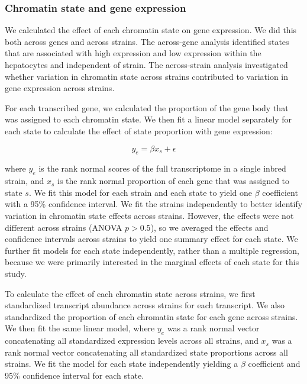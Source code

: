 \documentclass[
  11pt,
]{article}
\begin{document}
\hypertarget{chromatin-state-and-gene-expression}{%
\subsubsection{Chromatin state and gene
expression}\label{chromatin-state-and-gene-expression}}

We calculated the effect of each chromatin state on gene expression. We
did this both across genes and across strains. The across-gene analysis
identified states that are associated with high expression and low
expression within the hepatocytes and independent of strain. The
across-strain analysis investigated whether variation in chromatin state
across strains contributed to variation in gene expression across
strains.

For each transcribed gene, we calculated the proportion of the gene body
that was assigned to each chromatin state. We then fit a linear model
separately for each state to calculate the effect of state proportion
with gene expression:

\[y_{e} = \beta x_{s} + \epsilon\]

where \(y_{e}\) is the rank normal scores \citep{conover1999practical}
of the full transcriptome in a single inbred strain, and \(x_{s}\) is
the rank normal proportion of each gene that was assigned to state
\(s\). We fit this model for each strain and each state to yield one
\(\beta\) coefficient with a 95\% confidence interval. We fit the
strains independently to better identify variation in chromatin state
effects across strains. However, the effects were not different across
strains (ANOVA \(p > 0.5\)), so we averaged the effects and confidence
intervals across strains to yield one summary effect for each state. We
further fit models for each state independently, rather than a multiple
regression, because we were primarily interested in the marginal effects
of each state for this study.

To calculate the effect of each chromatin state across strains, we first
standardized transcript abundance across strains for each transcript. We
also standardized the proportion of each chromatin state for each gene
across strains. We then fit the same linear model, where \(y_{e}\) was a
rank normal vector concatenating all standardized expression levels
across all strains, and \(x_{s}\) was a rank normal vector concatenating
all standardized state proportions across all strains. We fit the model
for each state independently yielding a \(\beta\) coefficient and 95\%
confidence interval for each state.
\end{document}
